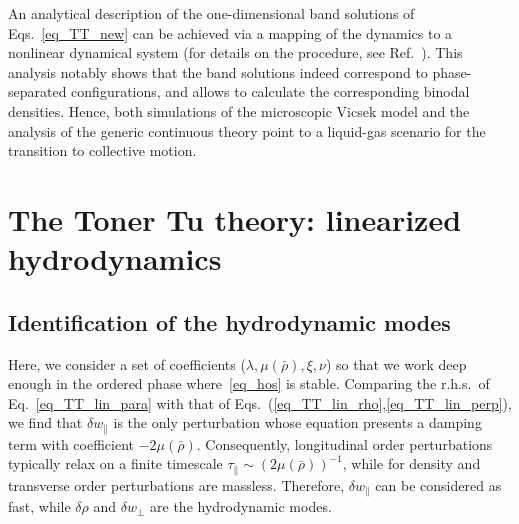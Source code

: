 An analytical description of the one-dimensional band solutions of Eqs.~\eqref{eq_TT_new} can be achieved via a mapping of the dynamics to a nonlinear dynamical system (for details on the procedure, see Ref.~\cite{DADAM_LesHouches}).
This analysis notably shows that the band solutions indeed correspond to phase-separated configurations, and allows to calculate the corresponding binodal densities.
Hence, both simulations of the microscopic Vicsek model and the analysis of the generic continuous theory point to a liquid-gas scenario for the transition to collective motion. 

\section{The Toner Tu theory: linearized hydrodynamics}

\subsection{Identification of the hydrodynamic modes}

Here, we consider a set of coefficients ($\lambda,\mu(\bar{\rho}),\xi,\nu$) so that we work deep enough in the ordered phase where~\eqref{eq_hos} is stable.
Comparing the r.h.s.\ of Eq.~\eqref{eq_TT_lin_para} with that of Eqs.~(\ref{eq_TT_lin_rho},\ref{eq_TT_lin_perp}), 
we find that $\delta w_\|$ is the only perturbation whose equation presents a damping term with coefficient $- 2\mu(\bar{\rho})$.
Consequently, longitudinal order perturbations typically relax on a finite timescale $\tau_\| \sim (2\mu(\bar{\rho}))^{-1}$,
while for density and transverse order perturbations are massless.
Therefore, $\delta w_\|$ can be considered as fast, 
while $\delta \rho$ and $\delta w_\perp$ are the hydrodynamic modes.

